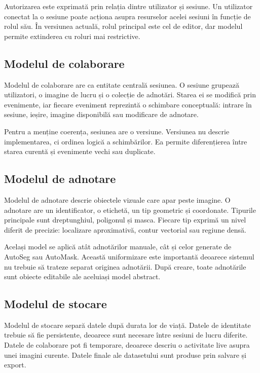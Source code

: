 Autorizarea este exprimată prin relația dintre utilizator și sesiune.
Un utilizator conectat la o sesiune poate acționa asupra resurselor acelei sesiuni în funcție de rolul său.
În versiunea actuală, rolul principal este cel de editor, dar modelul permite extinderea cu roluri mai restrictive.

\subsection{Modelul de colaborare}
\label{subsec:model-colaborare}

Modelul de colaborare are ca entitate centrală sesiunea.
O sesiune grupează utilizatori, o imagine de lucru și o colecție de adnotări.
Starea ei se modifică prin evenimente, iar fiecare eveniment reprezintă o schimbare conceptuală: intrare în sesiune, ieșire, imagine disponibilă sau modificare de adnotare.

Pentru a menține coerența, sesiunea are o versiune.
Versiunea nu descrie implementarea, ci ordinea logică a schimbărilor.
Ea permite diferențierea între starea curentă și evenimente vechi sau duplicate.

\subsection{Modelul de adnotare}
\label{subsec:model-adnotare}

Modelul de adnotare descrie obiectele vizuale care apar peste imagine.
O adnotare are un identificator, o etichetă, un tip geometric și coordonate.
Tipurile principale sunt dreptunghiul, poligonul și masca.
Fiecare tip exprimă un nivel diferit de precizie: localizare aproximativă, contur vectorial sau regiune densă.

Același model se aplică atât adnotărilor manuale, cât și celor generate de AutoSeg sau AutoMask.
Această uniformizare este importantă deoarece sistemul nu trebuie să trateze separat originea adnotării.
După creare, toate adnotările sunt obiecte editabile ale aceluiași model abstract.

\subsection{Modelul de stocare}
\label{subsec:model-stocare}

Modelul de stocare separă datele după durata lor de viață.
Datele de identitate trebuie să fie persistente, deoarece sunt necesare între sesiuni de lucru diferite.
Datele de colaborare pot fi temporare, deoarece descriu o activitate live asupra unei imagini curente.
Datele finale ale datasetului sunt produse prin salvare și export.

